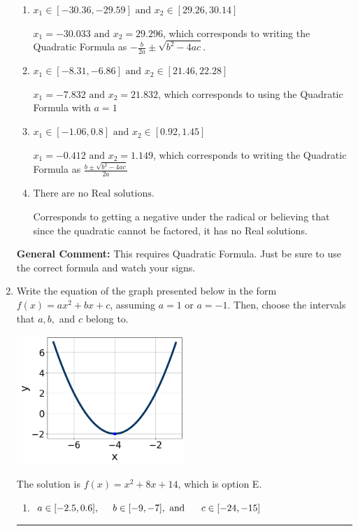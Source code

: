 \documentclass{extbook}[14pt]
\newcommand{\litem}[1]{\item #1

\rule{\textwidth}{0.4pt}}
\begin{document}
\begin{enumerate}
{\begin{enumerate}[label=\Alph*.]
* $x_1 = -1.149 \text{ and } x_2 = 0.412$, which is the correct option.
\item \( x_1 \in [-30.36, -29.59] \text{ and } x_2 \in [29.26, 30.14] \)

 $x_1 = -30.033 \text{ and } x_2 = 29.296$, which corresponds to writing the Quadratic Formula as $-\frac{b}{2a} \pm \sqrt{b^2 - 4ac}$.
\item \( x_1 \in [-8.31, -6.86] \text{ and } x_2 \in [21.46, 22.28] \)

 $x_1 = -7.832 \text{ and } x_2 = 21.832$, which corresponds to using the Quadratic Formula with $a=1$
\item \( x_1 \in [-1.06, 0.8] \text{ and } x_2 \in [0.92, 1.45] \)

 $x_1 = -0.412 \text{ and } x_2 = 1.149$, which corresponds to writing the Quadratic Formula as $\frac{b \pm \sqrt{b^2 - 4ac}}{2a}$
\item \( \text{There are no Real solutions.} \)

Corresponds to getting a negative under the radical or believing that since the quadratic cannot be factored, it has no Real solutions.
\end{enumerate}

\textbf{General Comment:} This requires Quadratic Formula. Just be sure to use the correct formula and watch your signs.
}
\litem{
Write the equation of the graph presented below in the form $f(x)=ax^2+bx+c$, assuming  $a=1$ or $a=-1$. Then, choose the intervals that $a, b,$ and $c$ belong to.

\begin{center}
    \includegraphics[width=0.5\textwidth]{../Figures/quadraticGraphToEquationCopyB.png}
\end{center}


The solution is \( f(x) = x^{2} +8 x + 14 \), which is option E.\begin{enumerate}[label=\Alph*.]
\item \( a \in [-2.5, 0.6], \hspace*{5mm} b \in [-9, -7], \text{ and } \hspace*{5mm} c \in [-24, -15] \)


\end{enumerate}}
\end{enumerate}
\end{document}
